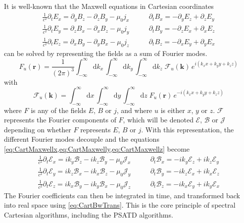 \documentclass[a4paper]{article}   	%
\newcommand{\Integ}[1]{\int_{-\infty}^{\infty} \!\!\!\!\!\!\!\!
  \mathrm{d}#1}
\renewcommand{\vec}[1]{\boldsymbol{#1}}
\begin{document}
It is well-known that the Maxwell equations in Cartesian coordinates 
\begin{align}
\frac{1}{c^2}\partial_t E_x = \partial_y B_z - \partial_z B_y - \mu_0  j_x \qquad&   
\partial_t B_x = -\partial_y E_z + \partial_z E_y \label{eq:CartMaxwellx} \\
\frac{1}{c^2}\partial_t E_y = \partial_z B_x - \partial_x B_z - \mu_0  j_y \qquad &   
\partial_t B_y = -\partial_z E_x + \partial_x E_z \label{eq:CartMaxwelly}  \\
\frac{1}{c^2}\partial_t E_z = \partial_x B_y - \partial_y B_x - \mu_0  j_z \qquad &   
\partial_t B_z = -\partial_x E_y + \partial_y E_x \label{eq:CartMaxwellz} 
\end{align}
can be solved by representing the fields as a sum of Fourier modes.
\begin{equation}
\label{eq:CartBwTrans}
F_u(\vec{r}) = \frac{1}{(2\pi)^{3}}\Integ{k_x} \,\Integ{k_y}\,
\Integ{k_z} \; \mathcal{F}_u(\vec{k}) \, e^{i(k_x x + k_y y + k_z z)} 
\end{equation}
with 
\begin{equation}
\label{eq:CartFwTrans}
\mathcal{F}_u(\vec{k})  = \Integ{x} \,\Integ{y}\, \Integ{z} \;
F_u(\vec{r}) \, e^{-i(k_x x + k_y y + k_z z)} 
\end{equation}
where $F$ is any of the fields $E$, $B$ or $j$, and where $u$ is
either $x$, $y$ or $z$. $\mathcal{F}$ represents the Fourier
components of $F$, which will be denoted
$\mathcal{E}$, $\mathcal{B}$ or $\mathcal{J}$ depending on whether
$F$ represents $E$, $B$ or $j$. With this representation, the
different Fourier modes decouple and the equations 
\cref{eq:CartMaxwellx,eq:CartMaxwelly,eq:CartMaxwellz} become 
\begin{align}
\frac{1}{c^2}\partial_t \mathcal{E}_x = ik_y \mathcal{B}_z - ik_z \mathcal{B}_y - \mu_0 \mathcal{J}_x \qquad &   
\partial_t \mathcal{B}_x = -ik_y \mathcal{E}_z + ik_z \mathcal{E}_y \label{eq:CartSpectMaxwellx}\\
\frac{1}{c^2}\partial_t \mathcal{E}_y = ik_z \mathcal{B}_x - ik_x \mathcal{B}_z - \mu_0  \mathcal{J}_y \qquad &   
\partial_t \mathcal{B}_y = -ik_z \mathcal{E}_x + ik_x \mathcal{E}_z \label{eq:CartSpectMaxwelly}\\
\frac{1}{c^2}\partial_t \mathcal{E}_z = ik_x \mathcal{B}_y - ik_y \mathcal{B}_x - \mu_0 \mathcal{J}_z  \qquad &   
\partial_t \mathcal{B}_z = -ik_x \mathcal{E}_y + ik_y \mathcal{E}_x \label{eq:CartSpectMaxwellz}
\end{align}
The Fourier coefficients can then be integrated in time, and
transformed back into real space using \cref{eq:CartBwTrans}. This is
the core principle of spectral Cartesian algorithms, including the PSATD algorithms.
\end{document}

